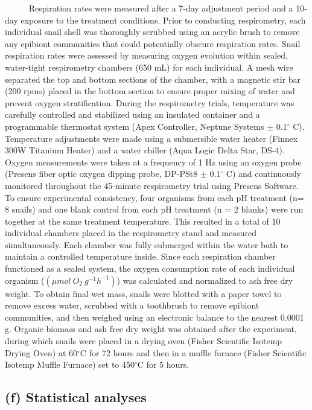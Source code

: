 \documentclass[
]{article}
\begin{document}
~~~~~ Respiration rates were measured after a 7-day adjustment period
and a 10-day exposure to the treatment conditions. Prior to conducting
respirometry, each individual snail shell was thoroughly scrubbed using
an acrylic brush to remove any epibiont communities that could
potentially obscure respiration rates. Snail respiration rates were
assessed by measuring oxygen evolution within sealed, water-tight
respirometry chambers (650 mL) for each individual. A mesh wire
separated the top and bottom sections of the chamber, with a magnetic
stir bar (200 rpms) placed in the bottom section to ensure proper mixing
of water and prevent oxygen stratification. During the respirometry
trials, temperature was carefully controlled and stabilized using an
insulated container and a programmable thermostat system (Apex
Controller, Neptune Systems \(\pm\) 0.1\(^\circ\) C). Temperature
adjustments were made using a submersible water heater (Finnex 300W
Titanium Heater) and a water chiller (Aqua Logic Delta Star, DS-4).
Oxygen measurements were taken at a frequency of 1 Hz using an oxygen
probe (Presens fiber optic oxygen dipping probe, DP-PSt8 \(\pm\)
0.1\(^\circ\) C) and continuously monitored throughout the 45-minute
respirometry trial using Presens Software. To ensure experimental
consistency, four organisms from each pH treatment (n= 8 snails) and one
blank control from each pH treatment (n = 2 blanks) were run together at
the same treatment temperature. This resulted in a total of 10
individual chambers placed in the respirometry stand and measured
simultaneously. Each chamber was fully submerged within the water bath
to maintain a controlled temperature inside. Since each respiration
chamber functioned as a sealed system, the oxygen consumption rate of
each individual organism (\((\mu mol \: O_2 \: g^{-1}h^{-1})\)) was
calculated and normalized to ash free dry weight. To obtain final wet
mass, snails were blotted with a paper towel to remove excess water,
scrubbed with a toothbrush to remove epibiont communities, and then
weighed using an electronic balance to the nearest 0.0001 g. Organic
biomass and ash free dry weight was obtained after the experiment,
during which snails were placed in a drying oven (Fisher Scientific
Isotemp Drying Oven) at 60\(^\circ\)C for 72 hours and then in a muffle
furnace (Fisher Scientific Isotemp Muffle Furnace) set to 450\(^\circ\)C
for 5 hours.

\hypertarget{f-statistical-analyses}{%
\subsection{(f) Statistical analyses}\label{f-statistical-analyses}}
\end{document}
